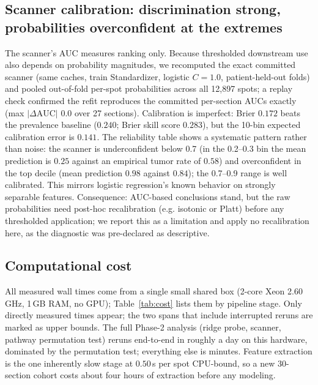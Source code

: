 \documentclass[11pt]{article}
\begin{document}
\subsection{Scanner calibration: discrimination strong, probabilities overconfident at the extremes}
The scanner's AUC measures ranking only. Because thresholded downstream use
also depends on probability magnitudes, we recomputed the exact committed
scanner (same caches, train Standardizer, logistic $C=1.0$, patient-held-out
folds) and pooled out-of-fold per-spot probabilities across all 12{,}897 spots;
a replay check confirmed the refit reproduces the committed per-section AUCs
exactly (max $|\Delta\mathrm{AUC}|$ $0.0$ over 27 sections). Calibration is
imperfect: Brier $0.172$ beats the prevalence baseline ($0.240$; Brier skill
score $0.283$), but the 10-bin expected calibration error is $0.141$. The
reliability table shows a systematic pattern rather than noise: the scanner is
underconfident below 0.7 (in the 0.2--0.3 bin the mean prediction is $0.25$
against an empirical tumor rate of $0.58$) and overconfident in the top decile
(mean prediction $0.98$ against $0.84$); the 0.7--0.9 range is well calibrated.
This mirrors logistic regression's known behavior on strongly separable
features. Consequence: AUC-based conclusions stand, but the raw probabilities
need post-hoc recalibration (e.g. isotonic or Platt) before any thresholded
application; we report this as a limitation and apply no recalibration here,
as the diagnostic was pre-declared as descriptive.

\subsection{Computational cost}
All measured wall times come from a single small shared box (2-core Xeon
2.60\,GHz, 1\,GB RAM, no GPU); Table~\ref{tab:cost} lists them by pipeline
stage. Only directly measured times appear; the two spans that include
interrupted reruns are marked as upper bounds. The full Phase-2 analysis
(ridge probe, scanner, pathway permutation test) reruns end-to-end in roughly
a day on this hardware, dominated by the permutation test; everything else is
minutes. Feature extraction is the one inherently slow stage at $0.50$\,s per
spot CPU-bound, so a new 30-section cohort costs about four hours of
extraction before any modeling.
\end{document}
